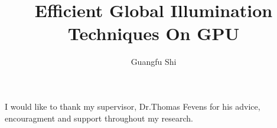 \documentclass[12pt]{report}
\author{Guangfu Shi}
\title{Efficient Global Illumination Techniques On GPU}
\begin{document}
\begin{abstract}

\end{abstract}

\begin{acknowledgments}
I would like to thank my supervisor, Dr.Thomas Fevens for his advice, encouragment and support throughout my research. 
\end{acknowledgments}


\setcounter{page}{1}

\begin{spacing}{2.0}
	








	

		

				



\end{spacing}
\end{document}
